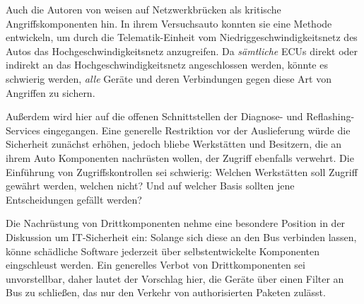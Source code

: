 \documentclass[
    fontsize=12pt,
    headings=small,
    parskip=half,           %
    bibliography=totoc,9
    numbers=noenddot,       %
    open=any,               %
    ]{scrreprt}
\begin{document}
Auch die Autoren von \cite{KCR10} weisen auf Netzwerkbrücken als kritische Angriffskomponenten hin. In ihrem Versuchsauto konnten sie eine Methode entwickeln, um durch die Telematik-Einheit vom Niedriggeschwindigkeitsnetz des Autos das Hochgeschwindigkeitsnetz anzugreifen. Da \textit{sämtliche} ECUs direkt oder indirekt an das Hochgeschwindigkeitsnetz angeschlossen werden, könnte es schwierig werden, \textit{alle} Geräte und deren Verbindungen gegen diese Art von Angriffen zu sichern.\par
Außerdem wird hier auf die offenen Schnittstellen der Diagnose- und Reflashing-Services eingegangen. Eine generelle Restriktion vor der Auslieferung würde die Sicherheit zunächst erhöhen, jedoch bliebe Werkstätten und Besitzern, die an ihrem Auto Komponenten nachrüsten wollen, der Zugriff ebenfalls verwehrt. Die Einführung von Zugriffskontrollen sei schwierig: Welchen Werkstätten soll Zugriff gewährt werden, welchen nicht? Und auf welcher Basis sollten jene Entscheidungen gefällt werden?\par
Die Nachrüstung von Drittkomponenten nehme eine besondere Position in der Diskussion um IT-Sicherheit ein: Solange sich diese an den Bus verbinden lassen, könne schädliche Software jederzeit über selbstentwickelte Komponenten eingschleust werden. Ein generelles Verbot von Drittkomponenten sei unvorstellbar, daher lautet der Vorschlag hier, die Geräte über einen Filter an Bus zu schließen, das nur den Verkehr von authorisierten Paketen zulässt.
\end{document}
